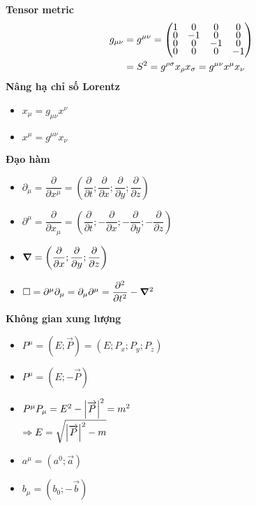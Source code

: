 \documentclass{report}
\begin{document}
\noindent \textbf{Tensor metric}
\begin{align*}
	g_{\mu\nu} & = g^{\mu\nu}
	=
	\renewcommand{\arraystretch}{0.55}
	\begin{pmatrix}
		1 & 0  & 0  & 0  \\
		0 & -1 & 0  & 0  \\
		0 & 0  & -1 & 0  \\
		0 & 0  & 0  & -1
	\end{pmatrix}                                                                   \\
	           & = S^2 = g^{\rho\sigma}x_{\rho} x_{\sigma} = g^{\mu\nu}x^{\mu} x_{\nu}
\end{align*}
\textbf{Nâng hạ chỉ số Lorentz}
\begin{itemize}
	\item $x_\mu= g_{\mu\nu}x^{\nu}$
	\item $x^\mu= g^{\mu\nu}x_{\nu}$
\end{itemize}
\textbf{Đạo hàm}
\begin{itemize}
	\item $\partial_\mu = \dfrac{\partial}{\partial x^\mu} = \left( \dfrac{\partial}{\partial t} ; \dfrac{\partial}{\partial x}; \dfrac{\partial}{\partial y}; \dfrac{\partial}{\partial z}   \right)$
	\item $\partial^\mu = \dfrac{\partial}{\partial x_\mu} = \left( \dfrac{\partial}{\partial t} ; -\dfrac{\partial}{\partial x}; -\dfrac{\partial}{\partial y}; -\dfrac{\partial}{\partial z}   \right)$
	\item $\grad = \left( \dfrac{\partial}{\partial x}; \dfrac{\partial}{\partial y}; \dfrac{\partial}{\partial z}   \right)$
	\item $\Box = \partial^\mu \partial_\mu = \partial_\mu \partial^\mu = \dfrac{\partial^2}{\partial t^2} - \grad^2$
\end{itemize}
\textbf{Không gian xung lượng}
\begin{itemize}
	\item $P^\mu = (E;\overrightarrow{P}) = (E; P_x;P_y;P_z)$
	\item $P^\mu = (E;-\overrightarrow{P}) $
	\item $P^\mu P_\mu =E^2 - \abs{\overrightarrow{P}}^2 = m^2 $\\
	      $\Rightarrow E = \sqrt{\abs{\overrightarrow{P}}^2 - m}$
	\item $a^\mu= (a^0;\overrightarrow{a})$
	\item $b_\mu= (b_0;-\overrightarrow{b})$
\end{itemize}
\end{document}
